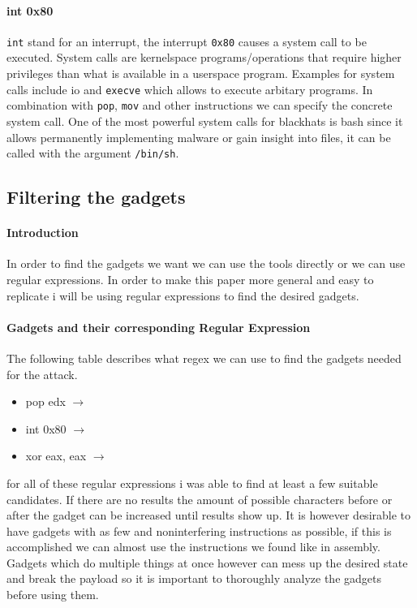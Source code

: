 \documentclass[journal=tosc,submission]{iacrtrans}
\begin{document}
\paragraph{int 0x80}
\Verb+int+ stand for an interrupt, the interrupt \Verb+0x80+ causes a system call to be executed. System calls are kernelspace programs/operations that require higher privileges than what is available in a userspace program. Examples for system calls include io and \Verb+execve+ which allows to execute arbitary programs. In combination with \Verb+pop+, \Verb+mov+ and other instructions we can specify the concrete system call. One of the most powerful system calls for blackhats is bash since it allows permanently implementing malware or gain insight into files, it can be called with the argument \Verb+/bin/sh+.
\subsection{Filtering the gadgets}
\paragraph{Introduction}
In order to find the gadgets we want we can use the tools directly or we can use regular expressions. In order to make this paper more general and easy to replicate i will be using regular expressions to find the desired gadgets.
\paragraph{Gadgets and their corresponding Regular Expression}
The following table describes what regex we can use to find the gadgets needed for the attack.

\begin{itemize}
\item pop edx  $\rightarrow$ 

\item int 0x80  $\rightarrow$  

\item xor eax, eax  $\rightarrow$  
\end{itemize}

for all of these regular expressions i was able to find at least a few suitable candidates. If there are no results the amount of possible characters before or after the gadget can be increased until results show up. It is however desirable to have gadgets with as few and noninterfering instructions as possible, if this is accomplished we can almost use the instructions we found like in assembly. Gadgets which do multiple things at once however can mess up the desired state and break the payload so it is important to thoroughly analyze the gadgets before using them.
\end{document}
